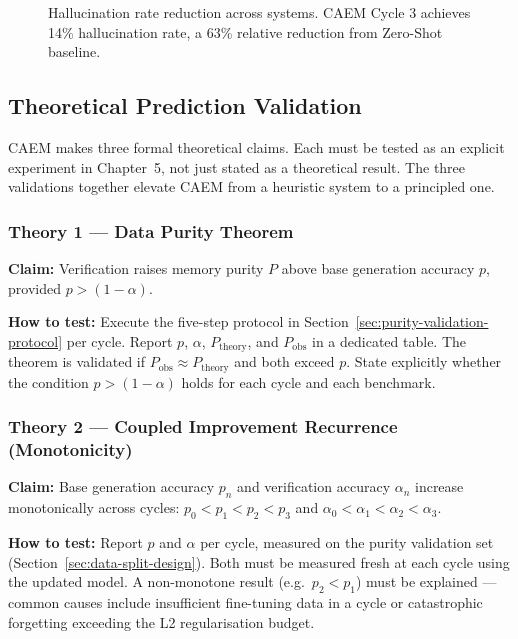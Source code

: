 \documentclass[12pt,a4paper]{article}
\theoremstyle{definition}
\begin{document}
\begin{figure}[htbp]
\caption{Hallucination rate reduction across systems. CAEM Cycle 3 achieves 14\% hallucination rate, a 63\% relative reduction from Zero-Shot baseline.}
\label{fig:hallucination}
\end{figure}

\subsection{Theoretical Prediction Validation}
\label{sec:theory-validation}

CAEM makes three formal theoretical claims. Each must be tested as an explicit experiment in Chapter~5, not just stated as a theoretical result. The three validations together elevate CAEM from a heuristic system to a principled one.

\subsubsection*{Theory 1 — Data Purity Theorem}

\textbf{Claim:} Verification raises memory purity $P$ above base generation accuracy $p$, provided $p > (1 - \alpha)$.

\textbf{How to test:} Execute the five-step protocol in Section~\ref{sec:purity-validation-protocol} per cycle. Report $p$, $\alpha$, $P_{\text{theory}}$, and $P_{\text{obs}}$ in a dedicated table. The theorem is validated if $P_{\text{obs}} \approx P_{\text{theory}}$ and both exceed $p$. State explicitly whether the condition $p > (1-\alpha)$ holds for each cycle and each benchmark.

\subsubsection*{Theory 2 — Coupled Improvement Recurrence (Monotonicity)}

\textbf{Claim:} Base generation accuracy $p_n$ and verification accuracy $\alpha_n$ increase monotonically across cycles: $p_0 < p_1 < p_2 < p_3$ and $\alpha_0 < \alpha_1 < \alpha_2 < \alpha_3$.

\textbf{How to test:} Report $p$ and $\alpha$ per cycle, measured on the purity validation set (Section~\ref{sec:data-split-design}). Both must be measured fresh at each cycle using the updated model. A non-monotone result (e.g.\ $p_2 < p_1$) must be explained — common causes include insufficient fine-tuning data in a cycle or catastrophic forgetting exceeding the L2 regularisation budget.
\end{document}
